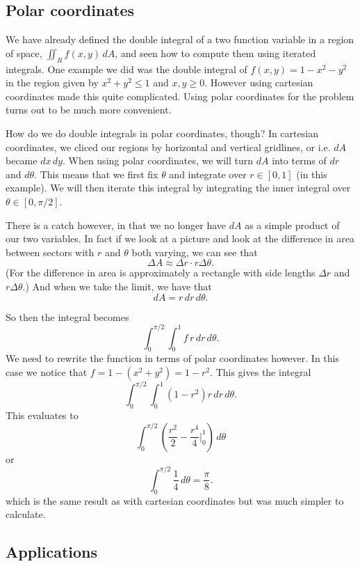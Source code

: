 \subsection{Polar coordinates}

We have already defined the double integral of a two function variable in a region of space, $\iint_R f(x,y)\,dA$, and seen how to compute them using iterated integrals. One example we did was the double integral of $f(x,y)=1-x^2-y^2$ in the region given by $x^2+y^2\le1$ and $x,y\ge0$. However using cartesian coordinates made this quite complicated. Using polar coordinates for the problem turns out to be much more convenient. 

How do we do double integrals in polar coordinates, though? In cartesian coordinates, we cliced our regions by horizontal and vertical gridlines, or i.e. $dA$ became $dx\,dy$. When using polar coordinates, we will turn $dA$ into terms of $dr$ and $d\theta$. This means that we first fix $\theta$ and integrate over $r \in [0,1]$ (in this example). We will then iterate this integral by integrating the inner integral over $\theta \in [0,\pi/2]$. 

There is a catch however, in that we no longer have $dA$ as a simple product of our two variables. In fact if we look at a picture and look at the difference in area between sectors with $r$ and $\theta$ both varying, we can see that 
\[ \Delta A \approx \Delta r \cdot r\Delta \theta. \]
(For the difference in area is approximately a rectangle with side lengths $\Delta r$ and $r\Delta \theta$.) And when we take the limit, we have that 
\[ dA = r\,dr\,d\theta. \]

So then the integral becomes
\[ \int_0^{\pi/2} \int_0^1 f\,r\,dr\,d\theta. \]
We need to rewrite the function in terms of polar coordinates however. In this case we notice that $f = 1 - (x^2+y^2) = 1-r^2$. This gives the integral
\[ \int_0^{\pi/2} \int_0^1 (1-r^2)r\,dr\,d\theta. \]
This evaluates to
\[ \int_0^{\pi/2} \left( \frac{r^2}2-\frac{r^4}4\bigg|_0^1\right)\,d\theta \]
or
\[ \int_0^{\pi/2} \frac 14\,d\theta = \frac{\pi}8. \]
which is the same result as with cartesian coordinates but was much simpler to calculate.

\subsection{Applications}

